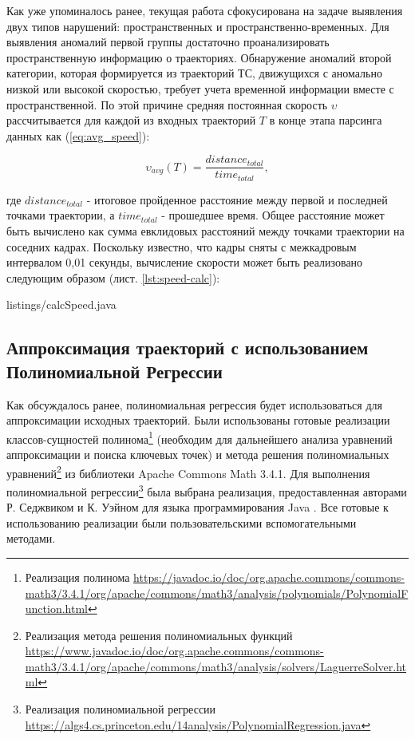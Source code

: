Как уже упоминалось ранее, текущая работа сфокусирована на задаче выявления двух типов нарушений: пространственных и пространственно-временных. Для выявления аномалий первой группы достаточно проанализировать пространственную информацию о траекториях. Обнаружение аномалий второй категории, которая формируется из траекторий ТС, движущихся с аномально низкой или высокой скоростью, требует учета временной информации вместе с пространственной. По этой причине средняя постоянная скорость $\upsilon$ рассчитывается для каждой из входных траекторий $T$ в конце этапа парсинга данных как (\ref{eq:avg_speed}):

\begin{equation} \label{eq:avg_speed}
\upsilon_{avg}(T) = \frac{distance_{total}} {time_{total}},
\end{equation}

где $distance_{total}$ - итоговое пройденное расстояние между первой и последней точками траектории, а $time_{total}$ - прошедшее время. Общее расстояние может быть вычислено как сумма евклидовых расстояний между точками траектории на соседних кадрах. Поскольку известно, что кадры сняты с межкадровым интервалом 0,01 секунды, вычисление скорости может быть реализовано следующим образом (лист. \ref{lst:speed-calc}):

\lstset{style=code-style-java}
 {listings/calcSpeed.java}

\subsection{Аппроксимация траекторий с использованием Полиномиальной Регрессии}

Как обсуждалось ранее, полиномиальная регрессия будет использоваться для аппроксимации исходных траекторий. Были использованы готовые реализации классов-сущностей полинома\footnote{Реализация полинома \url{https://javadoc.io/doc/org.apache.commons/commons-math3/3.4.1/org/apache/commons/math3/analysis/polynomials/PolynomialFunction.html}} (необходим для дальнейшего анализа уравнений аппроксимации и поиска ключевых точек) и метода решения полиномиальных уравнений\footnote{Реализация метода решения полиномиальных функций \url{https://www.javadoc.io/doc/org.apache.commons/commons-math3/3.4.1/org/apache/commons/math3/analysis/solvers/LaguerreSolver.html}} из библиотеки Apache Commons Math 3.4.1. Для выполнения полиномиальной регрессии\footnote{Реализация полиномиальной регрессии \url{https://algs4.cs.princeton.edu/14analysis/PolynomialRegression.java}} была выбрана реализация, предоставленная авторами Р. Седжвиком и К. Уэйном для языка программирования Java \cite{online:polynomial_impl}. Все готовые к использованию реализации были пользовательскими вспомогательными методами.

